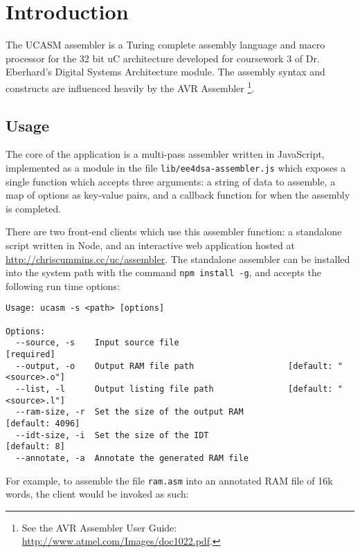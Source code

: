 \documentclass[12pt,twoside]{report}
\begin{document}



\tableofcontents

\newpage


\chapter{Introduction}

The UCASM assembler is a Turing complete assembly language and macro
processor for the 32 bit uC architecture developed for coursework 3 of
Dr. Eberhard's Digital Systems Architecture module. The assembly
syntax and constructs are influenced heavily by the AVR Assembler
\footnote{See the AVR Assembler User Guide:
  \url{http://www.atmel.com/Images/doc1022.pdf}.}.

\section{Usage}

The core of the application is a multi-pass assembler written in
JavaScript, implemented as a module in the file
\texttt{lib/ee4dsa-assembler.js} which exposes a single function which
accepts three arguments: a string of data to assemble, a map of
options as key-value pairs, and a callback function for when the
assembly is completed.

There are two front-end clients which use this assembler function: a
standalone script written in Node, and an interactive web application
hosted at \url{http://chriscummins.cc/uc/assembler}. The standalone
assembler can be installed into the system path with the command
\texttt{npm install -g}, and accepts the following run time options:

\begin{verbatim}
Usage: ucasm -s <path> [options]

Options:
  --source, -s    Input source file                                   [required]
  --output, -o    Output RAM file path                   [default: "<source>.o"]
  --list, -l      Output listing file path               [default: "<source>.l"]
  --ram-size, -r  Set the size of the output RAM                 [default: 4096]
  --idt-size, -i  Set the size of the IDT                           [default: 8]
  --annotate, -a  Annotate the generated RAM file
\end{verbatim}

For example, to assemble the file \texttt{ram.asm} into an annotated
RAM file of 16k words, the client would be invoked as such:
\end{document}
